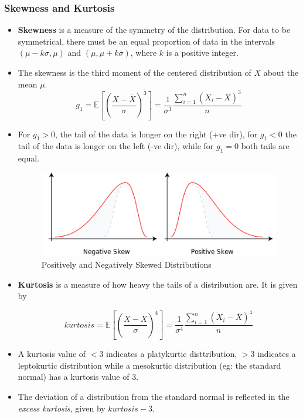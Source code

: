 \documentclass{article}
\theoremstyle{plain}
\theoremstyle{definition}
\begin{document}
\subsubsection{Skewness and Kurtosis}
\begin{itemize}
    \item \textbf{Skewness} is a measure of the symmetry of the distribution. For data to be symmetrical, there must be an equal proportion of data in the intervals $(\mu - k\sigma, \mu)$ and $(\mu, \mu + k\sigma)$, where $k$ is a positive integer. 
    
    \item The skewness is the third moment of the centered distribution of $X$ about the mean $\mu$.
    \begin{equation}
        g_1 = \mathbb{E}\left[ \left(\frac{X - \overline{X}}{\sigma} \right)^3 \right] = \frac{1}{\sigma^3} \frac{\sum_{i=1}^{n} (X_i - \overline{X})^3}{n} 
    \end{equation}
    
    \item For $g_1 > 0$, the tail of the data is longer on the right (+ve dir), for $g_1 < 0$ the tail of the data is longer on the left (-ve dir), while for $g_1 = 0$ both tails are equal. 
    
    \begin{figure}[h]
        \centering
        \includegraphics{da2.png}
        \caption{Positively and Negatively Skewed Distributions}
        \label{fig:my_label_2}
    \end{figure}
    
    \item \textbf{Kurtosis} is a measure of how heavy the tails of a distribution are. It is given by
    
    \begin{equation}
        kurtosis = \mathbb{E}\left[ \left(\frac{X - \overline{X}}{\sigma} \right)^4 \right] = \frac{1}{\sigma^4} \frac{\sum_{i=1}^{n} (X_i - \overline{X})^4}{n}
    \end{equation}
    
    \item A kurtosis value of $<3$ indicates a platykurtic disttribution, $>3$ indicates a leptokurtic distribution while a mesokurtic distribution (eg: the standard normal) has a kurtosis value of 3. 
    
    \item The deviation of a distribution from the standard normal is reflected in the \textit{excess kurtosis}, given by $kurtosis - 3$.
\end{itemize}
\end{document}
